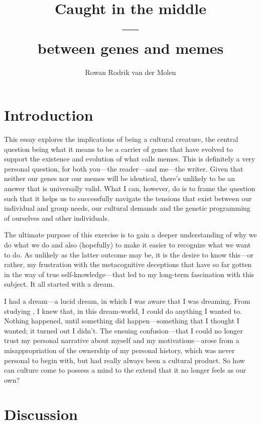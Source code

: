 \documentclass{article}
\title{Caught in the middle\\---\\between genes and memes}
\author{Rowan Rodrik van der Molen}
\begin{document}
\maketitle

\tableofcontents

\section{Introduction}
\label{sec:intro}

This essay explores the implications of being a cultural creature, the central
question being what it means to be a carrier of genes that have evolved to support
the existence and evolution of what \citet{dawkins1976} calls memes. This is
definitely a very personal question, for both you---the reader---and me---the
writer. Given that neither our genes nor our memes will be identical, there's
unlikely to be an answer that is universally valid. What I can, however, do is
to frame the question such that it helps us to successfully navigate the
tensions that exist between our individual and group needs, our cultural
demands and the genetic programming of ourselves and other individuals.

The ultimate purpose of this exercise is to gain a deeper understanding of why
we do what we do and also (hopefully) to make it easier to recognize what
we want to do. As unlikely as the latter outcome may be, it is the desire to
know this---or rather, my frustration with the metacognitive deceptions that
have so far gotten in the way of true self-knowledge---that led to my long-term
fascination with this subject. It all started with a dream.

I had a dream---a lucid dream, in which I was aware that I was dreaming. From
studying \citet{laberge1990}, I knew that, in this dream-world, I could do
anything I wanted to. Nothing happened, until something did happen---something
that I thought I wanted; it turned out I didn't. The ensuing confusion---that I
could no longer trust my personal narrative about myself and my
motivations---arose from a misappropriation of the ownership of my personal
history, which was never personal to begin with, but had really always been a
cultural product. So how can culture come to possess a mind to the extend that
it no longer feels as our own?

\section{Discussion}
\end{document}
